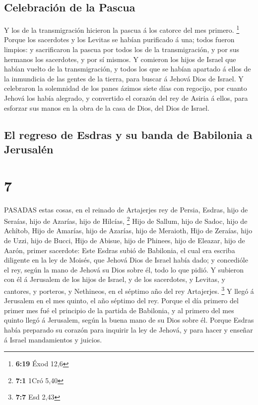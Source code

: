 \hypertarget{celebraciuxf3n-de-la-pascua}{%
\subsection{Celebración de la
Pascua}\label{celebraciuxf3n-de-la-pascua}}

 Y los de la transmigración hicieron la pascua á los
catorce del mes primero. \footnote{\textbf{6:19} Éxod 12,6}
 Porque los sacerdotes y los Levitas se habían purificado á
una; todos fueron limpios: y sacrificaron la pascua por todos los de la
transmigración, y por sus hermanos los sacerdotes, y por sí mismos.
 Y comieron los hijos de Israel que habían vuelto de la
transmigración, y todos los que se habían apartado á ellos de la
inmundicia de las gentes de la tierra, para buscar á Jehová Dios de
Israel.  Y celebraron la solemnidad de los panes ázimos
siete días con regocijo, por cuanto Jehová los había alegrado, y
convertido el corazón del rey de Asiria á ellos, para esforzar sus manos
en la obra de la casa de Dios, del Dios de Israel.

\hypertarget{el-regreso-de-esdras-y-su-banda-de-babilonia-a-jerusaluxe9n}{%
\subsection{El regreso de Esdras y su banda de Babilonia a
Jerusalén}\label{el-regreso-de-esdras-y-su-banda-de-babilonia-a-jerusaluxe9n}}

\hypertarget{section-6}{%
\section{7}\label{section-6}}

 PASADAS estas cosas, en el reinado de Artajerjes rey de
Persia, Esdras, hijo de Seraías, hijo de Azarías, hijo de Hilcías,
\footnote{\textbf{7:1} 1Cró 5,40}  Hijo de Sallum, hijo de
Sadoc, hijo de Achîtob,  Hijo de Amarías, hijo de Azarías,
hijo de Meraioth,  Hijo de Zeraías, hijo de Uzzi, hijo de
Bucci,  Hijo de Abisue, hijo de Phinees, hijo de Eleazar,
hijo de Aarón, primer sacerdote:  Este Esdras subió de
Babilonia, el cual era escriba diligente en la ley de Moisés, que Jehová
Dios de Israel había dado; y concedióle el rey, según la mano de Jehová
su Dios sobre él, todo lo que pidió.  Y subieron con él á
Jerusalem de los hijos de Israel, y de los sacerdotes, y Levitas, y
cantores, y porteros, y Nethineos, en el séptimo año del rey Artajerjes.
\footnote{\textbf{7:7} Esd 2,43}  Y llegó á Jerusalem en el
mes quinto, el año séptimo del rey.  Porque el día primero
del primer mes fué el principio de la partida de Babilonia, y al primero
del mes quinto llegó á Jerusalem, según la buena mano de su Dios sobre
él.  Porque Esdras había preparado su corazón para inquirir
la ley de Jehová, y para hacer y enseñar á Israel mandamientos y
juicios.

